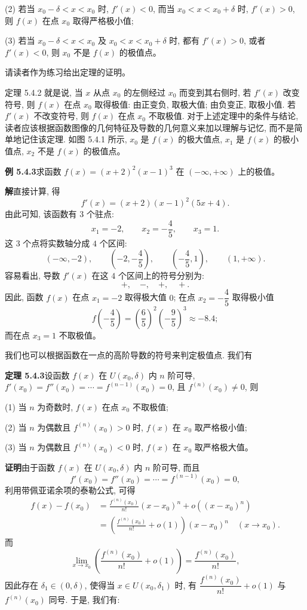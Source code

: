\documentclass[UTF8,12pt,a4paper,fontset=fandol]{ctexart}
\begin{document}
(2) 若当 $x_0-\delta<x<x_0$ 时, $f'(x)<0$, 而当 $x_0<x<x_0+\delta$ 时, $f'(x)>0$, 则 $f(x)$ 在点 $x_0$ 取得严格极小值;

(3) 若当 $x_0-\delta<x<x_0$ 及 $x_0<x<x_0+\delta$ 时, 都有 $f'(x)>0$, 或者 $f'(x)<0$, 则 $x_0$ 不是 $f(x)$ 的极值点。

请读者作为练习给出定理的证明。

定理 5.4.2 就是说, 当 $x$ 从点 $x_0$ 的左侧经过 $x_0$ 而变到其右侧时, 若 $f'(x)$ 改变符号, 则 $f(x)$ 在点 $x_0$ 取得极值: 由正变负, 取极大值; 由负变正, 取极小值. 若 $f'(x)$ 不改变符号, 则 $f(x)$ 在点 $x_0$ 不取极值. 对于上述定理中的条件与结论, 读者应该根据函数图像的几何特征及导数的几何意义来加以理解与记忆, 而不是简单地记住该定理. 如图 5.4.1 所示, $x_0$ 是 $f(x)$ 的极大值点, $x_1$ 是 $f(x)$ 的极小值点, $x_2$ 不是 $f(x)$ 的极值点。

\noindent\textbf{例 5.4.3}\quad 求函数 $f(x)=(x+2)^2(x-1)^3$ 在 $(-\infty,+\infty)$ 上的极值。

\noindent\textbf{解}\quad 直接计算, 得
\[
  f'(x)=(x+2)(x-1)^2(5x+4).
\]
由此可知, 该函数有 $3$ 个驻点:
\[
  x_1=-2,\qquad x_2=-\frac45,\qquad x_3=1.
\]
这 $3$ 个点将实数轴分成 $4$ 个区间:
\[
  (-\infty,-2),\qquad \left(-2,-\frac45\right),\qquad
  \left(-\frac45,1\right),\qquad (1,+\infty).
\]
容易看出, 导数 $f'(x)$ 在这 $4$ 个区间上的符号分别为:
\[
  +,\quad -,\quad +,\quad +.
\]
因此, 函数 $f(x)$ 在点 $x_1=-2$ 取得极大值 $0$; 在点 $x_2=-\dfrac45$ 取得极小值
\[
  f\left(-\frac45\right)=\left(\frac65\right)^2\left(-\frac95\right)^3\approx -8.4;
\]
而在点 $x_3=1$ 不取极值。

我们也可以根据函数在一点的高阶导数的符号来判定极值点. 我们有

\noindent\textbf{定理 5.4.3}\quad 设函数 $f(x)$ 在 $U(x_0,\delta)$ 内 $n$ 阶可导, $f'(x_0)=f''(x_0)=\cdots=f^{(n-1)}(x_0)=0$, 且 $f^{(n)}(x_0)\ne0$, 则

(1) 当 $n$ 为奇数时, $f(x)$ 在点 $x_0$ 不取极值;

(2) 当 $n$ 为偶数且 $f^{(n)}(x_0)>0$ 时, $f(x)$ 在 $x_0$ 取严格极小值;

(3) 当 $n$ 为偶数且 $f^{(n)}(x_0)<0$ 时, $f(x)$ 在 $x_0$ 取严格极大值。

\noindent\textbf{证明}\quad 由于函数 $f(x)$ 在 $U(x_0,\delta)$ 内 $n$ 阶可导, 而且
\[
  f'(x_0)=f''(x_0)=\cdots=f^{(n-1)}(x_0)=0,
\]
利用带佩亚诺余项的泰勒公式, 可得
\begin{equation}
\begin{aligned}
  f(x)-f(x_0)
  &=\frac{f^{(n)}(x_0)}{n!}(x-x_0)^n+o((x-x_0)^n)\\
  &=\left(\frac{f^{(n)}(x_0)}{n!}+o(1)\right)(x-x_0)^n\quad (x\to x_0).
\end{aligned}
\tag{5.4.1}
\end{equation}
而
\[
  \lim_{x\to x_0}\left(\frac{f^{(n)}(x_0)}{n!}+o(1)\right)
  =\frac{f^{(n)}(x_0)}{n!},
\]
因此存在 $\delta_1\in(0,\delta)$, 使得当 $x\in U(x_0,\delta_1)$ 时, 有 $\dfrac{f^{(n)}(x_0)}{n!}+o(1)$ 与 $f^{(n)}(x_0)$ 同号. 于是, 我们有:
\end{document}
